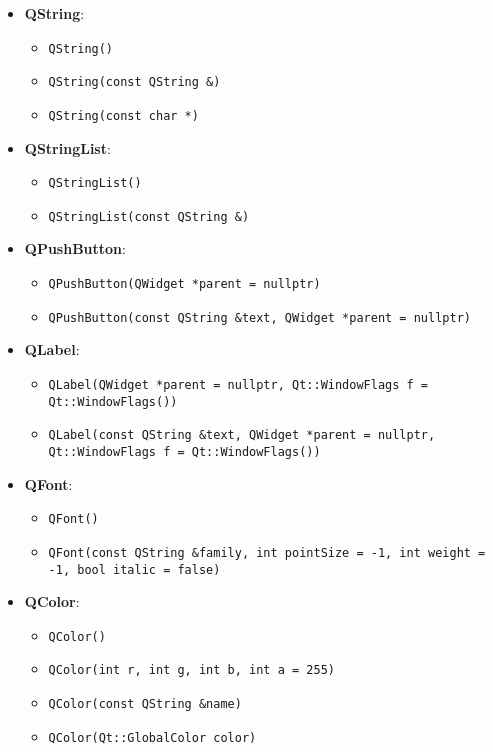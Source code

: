 \documentclass{report}
\begin{document}
    \pagebreak 
    \begin{itemize}
        \item \textbf{QString}:
        \begin{itemize}
            \item \texttt{QString()}
            \item \texttt{QString(const QString \&)}
            \item \texttt{QString(const char *)}
        \end{itemize}

        \item \textbf{QStringList}:
        \begin{itemize}
            \item \texttt{QStringList()}
            \item \texttt{QStringList(const QString \&)}
        \end{itemize}

        \item \textbf{QPushButton}:
        \begin{itemize}
            \item \texttt{QPushButton(QWidget *parent = nullptr)}
            \item \texttt{QPushButton(const QString \&text, QWidget *parent = nullptr)}
        \end{itemize}

        \item \textbf{QLabel}:
        \begin{itemize}
            \item \texttt{QLabel(QWidget *parent = nullptr, Qt::WindowFlags f = Qt::WindowFlags())}
            \item \texttt{QLabel(const QString \&text, QWidget *parent = nullptr, Qt::WindowFlags f = Qt::WindowFlags())}
        \end{itemize}

        \item \textbf{QFont}:
        \begin{itemize}
            \item \texttt{QFont()}
            \item \texttt{QFont(const QString \&family, int pointSize = -1, int weight = -1, bool italic = false)}
        \end{itemize}

        \item \textbf{QColor}:
        \begin{itemize}
            \item \texttt{QColor()}
            \item \texttt{QColor(int r, int g, int b, int a = 255)}
            \item \texttt{QColor(const QString \&name)}
            \item \texttt{QColor(Qt::GlobalColor color)}
        \end{itemize}


\end{itemize}
\end{document}
